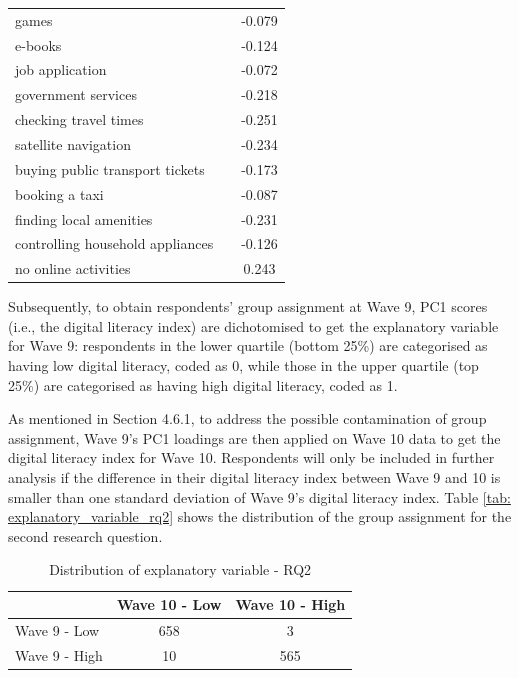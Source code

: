 \begin{table}
\begin{subtable}[t]{0.4\textwidth}
\begin{tabular}{llc}
                games &  & -0.079 \\
                e-books &  & -0.124 \\
                job application &  & -0.072 \\
                government services &  & -0.218 \\
                checking travel times &  & -0.251 \\
                satellite navigation &  & -0.234 \\
                buying public transport tickets &  & -0.173 \\
                booking a taxi &  & -0.087 \\
                finding local amenities &  & -0.231 \\
                controlling household appliances &  & -0.126 \\
                no online activities &  & 0.243 \\
                \bottomrule
            \end{tabular}
        \end{subtable}
\end{table}

Subsequently, to obtain respondents' group assignment at Wave 9, PC1 scores (i.e., the digital literacy index) are dichotomised to get the explanatory variable for Wave 9: respondents in the lower quartile (bottom 25\%) are categorised as having low digital literacy, coded as 0, while those in the upper quartile (top 25\%) are categorised as having high digital literacy, coded as 1.

As mentioned in Section 4.6.1, to address the possible contamination of group assignment, Wave 9's PC1 loadings are then applied on Wave 10 data to get the digital literacy index for Wave 10. Respondents will only be included in further analysis if the difference in their digital literacy index between Wave 9 and 10 is smaller than one standard deviation of Wave 9's digital literacy index. Table \ref{tab: explanatory_variable_rq2} shows the distribution of the group assignment for the second research question.

\begin{table}[h!]
    \centering
    \caption{Distribution of explanatory variable - RQ2}
    \label{tab:explanatory_variable_rq2}
    \begin{tabular}{lcc}
        \toprule
         & Wave 10 - Low & Wave 10 - High \\
        \midrule
        Wave 9 - Low & 658 & 3 \\
        Wave 9 - High & 10 & 565 \\
        \bottomrule
    \end{tabular}
\end{table}

